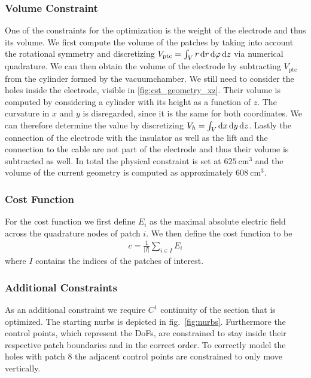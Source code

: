 \subsubsection{Volume Constraint}
One of the constraints for the optimization is the weight of the electrode and thus its volume.
We first compute the volume of the patches by taking into account the rotational symmetry and discretizing $V_{\mathrm{ptc}} = \int_V r\, \mathrm{d} r\, \mathrm{d} \varphi\, \mathrm{d} z$ via numerical quadrature. We can then obtain the volume of the electrode by subtracting $V_{\mathrm{ptc}}$ from the cylinder formed by the vacuumchamber.
We still need to consider the holes inside the electrode, visible in \ref{fig:cst_geometry_xz}. Their volume is computed by considering a cylinder with its height as a function of $z$. The curvature in $x$ and $y$ is disregarded, since it is the same for both coordinates. We can therefore determine the value by discretizing $V_{h} = \int_V \mathrm{d} x\, \mathrm{d} y\, \mathrm{d} z$.
Lastly the connection of the electrode with the insulator as well as the lift and the connection to the cable are not part of the electrode and thus their volume is subtracted as well.
In total the physical constraint is set at $625\ \mathrm{cm}^3$ and the volume of the current geometry is computed as approximately $608\ \mathrm{cm}^3$.

\subsubsection{Cost Function}
For the cost function we first define $E_i$ as the maximal absolute electric field across the quadrature nodes of patch $i$.
We then define the cost function to be
\begin{align}
   c = \frac{1}{|I|} \sum_{i \in I} E_i
\end{align}
where $I$ contains the indices of the patches of interest.

\subsubsection{Additional Constraints}
As an additional constraint we require $C^1$ continuity of the section that is optimized. The starting nurbs is depicted in fig.~\ref{fig:nurbs}. Furthermore the control points, which represent the DoFs, are constrained to stay inside their respective patch boundaries and in the correct order. To correctly model the holes with patch 8 the adjacent control points are constrained to only move vertically.

